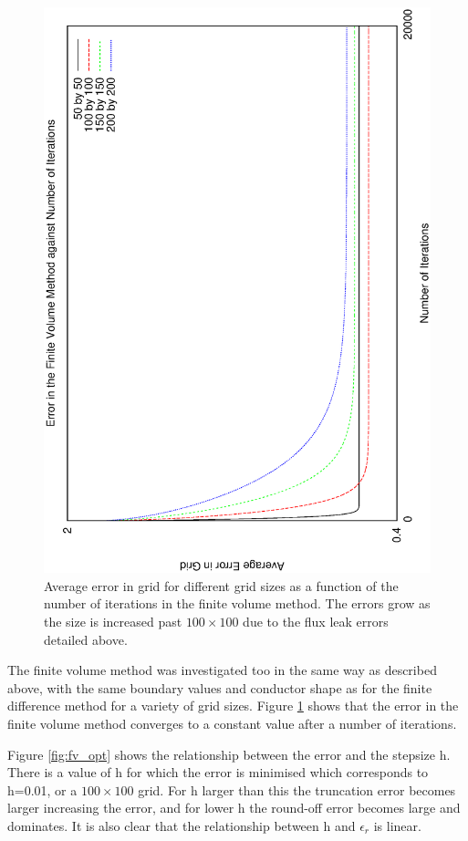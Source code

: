 \documentclass[aps,twocolumn,pre,nofootinbib,10pt]{revtex4-1}
\begin{document}
\begin{figure}
\includegraphics[height=\breite \columnwidth,angle=-90]{fv_it.eps}
\caption{Average error in grid for different grid sizes as a function of the number of iterations in the finite volume method. The errors grow as the size is increased past $100 \times 100$ due to the flux leak errors detailed above.}
\label{fig:fv}
\end{figure}

The finite volume method was investigated too in the same way as described above, with the same boundary values and conductor shape as for the finite difference method for a variety of grid sizes. Figure \ref{fig:fv} shows that the error in the finite volume method converges to a constant value after a number of iterations.

Figure \ref{fig:fv_opt} shows the relationship between the error and the stepsize h. There is a value of h for which the error is minimised which corresponds to h=0.01, or a $100 \times 100$ grid. For h larger than this the truncation error becomes larger increasing the error, and for lower h the round-off error becomes large and dominates. It is also clear that the relationship between h and \(\epsilon_r\) is linear.\footnotemark[\value{footnote}]
\end{document}
